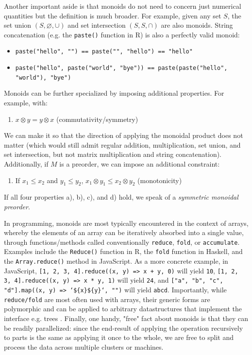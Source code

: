 \documentclass[12pt,a4paper]{article}
\begin{document}
Another important aside is that monoids do not need to concern just numerical quantities but the definition is much broader. For example, given any set $S$, the set union $(S, \varnothing, \cup)$ and set intersection $(S, S, \cap)$ are also monoids. String concatenation (e.g. the \texttt{paste()} function in R) is also a perfectly valid monoid: 

\begin{itemize}
\item \texttt{paste("hello", "") == paste("", "hello") == "hello"}
\item \texttt{paste("hello", paste("world", "bye")) == paste(paste("hello", "world"), "bye")}
\end{itemize}

Monoids can be further specialized by imposing additional properties. For example, with:

\begin{enumerate}
\renewcommand{\theenumi}{\alph{enumi}}
\setcounter{enumi}{2}
\item $x \otimes y = y \otimes x$ (commutativity/symmetry)
\end{enumerate}

We can make it so that the direction of applying the monoidal product does not matter (which would still admit regular addition, multiplication, set union, and set intersection, but not matrix multiplication and string concatenation). Additionally, if $M$ is a preorder, we can impose an additional constraint:

\begin{enumerate}
\renewcommand{\theenumi}{\alph{enumi}}
\setcounter{enumi}{3}
\item If $x_1 \leq x_2$ and $y_1 \leq y_2$, $x_1 \otimes y_1 \leq x_2 \otimes y_2$ (monotonicity)
\end{enumerate}

If all four properties a), b), c), and d) hold, we speak of a \textit{symmetric monoidal preorder}. 

In programming, monoids are most typically encountered in the context of arrays, whereby the elements of an array can be iteratively absorbed into a single value, through functions/methods called conventionally \texttt{reduce}, \texttt{fold}, or \texttt{accumulate}. Examples include the \texttt{Reduce()} function in R, the \texttt{fold} function in Haskell, and the \texttt{Array.reduce()} method in JavaScript. As a more concrete example, in JavaScript, \texttt{[1, 2, 3, 4].reduce((x, y) => x + y, 0)} will yield \texttt{10}, \texttt{[1, 2, 3, 4].reduce((x, y) => x * y, 1)} will yield \texttt{24}, and \texttt{["a", "b", "c", "d"].map((x, y) => `\$\{x\}\$\{y\}`, "")} will yield \texttt{abcd}. Importantly, while \texttt{reduce/fold} are most often used with arrays, their generic forms are polymorphic and can be applied to arbitrary datastructures that implement the interface e.g. trees \citep{braithwaite2019}. Finally, one handy, "free" fact about monoids is that they can be readily parallelized: since the end-result of applying the operation recursively to parts is the same as applying it once to the whole, we are free to split and process the data across multiple clusters or machines.  
\end{document}
